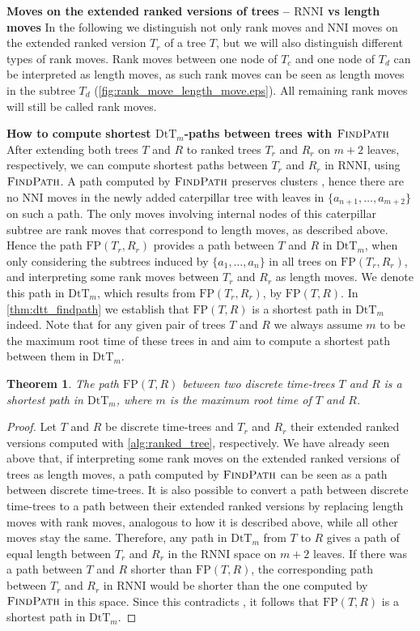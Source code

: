 \documentclass[11pt]{amsart}
\newtheorem{theorem}{Theorem}
\newcommand{\rnni}{\mathrm{RNNI}}
\newcommand{\findpath}{\textsc{FindPath}}
\newcommand{\nni}{\mathrm{NNI}}
\newcommand{\fp}{\mathrm{FP}}
\newcommand{\dtt}{\mathrm{DtT}}
\newcommand{\summary}[1]{\textbf{#1}} %
\begin{document}
\summary{Moves on the extended ranked versions of trees -- $\rnni$ vs length moves}
In the following we distinguish not only rank moves and $\nni$ moves on the extended ranked version $T_r$ of a tree $T$, but we will also distinguish different types of rank moves.
Rank moves between one node of $T_c$ and one node of $T_d$ can be interpreted as length moves, as such rank moves can be seen as length moves in the subtree $T_d$ (\autoref{fig:rank_move_length_move.eps}).
All remaining rank moves will still be called rank moves.

\summary{How to compute shortest $\dtt_m$-paths between trees with $\findpath$}
After extending both trees $T$ and $R$ to ranked trees $T_r$ and $R_r$ on $m+2$ leaves, respectively, we can compute shortest paths between $T_r$ and $R_r$ in $\rnni$, using $\findpath$.
A path computed by $\findpath$ preserves clusters \autocite{Collienne2020-iu}, hence there are no $\nni$ moves in the newly added caterpillar tree with leaves in $\{a_{n+1}, \ldots, a_{m+2}\}$ on such a path.
The only moves involving internal nodes of this caterpillar subtree are rank moves that correspond to length moves, as described above.
Hence the path $\fp(T_r,R_r)$ provides a path between $T$ and $R$ in $\dtt_m$, when only considering the subtrees induced by $\{a_1, \ldots, a_n\}$ in all trees on $\fp(T_r, R_r)$, and interpreting some rank moves between $T_r$ and $R_r$ as length moves.
We denote this path in $\dtt_m$, which results from $\fp(T_r, R_r)$, by $\fp(T,R)$.
In \autoref{thm:dtt_findpath} we establish that $\fp(T,R)$ is a shortest path in $\dtt_m$ indeed.
Note that for any given pair of trees $T$ and $R$ we always assume $m$ to be the maximum root time of these trees in and aim to compute a shortest path between them in $\dtt_m$. 

\begin{theorem}
	The path $\fp(T,R)$ between two discrete time-trees $T$ and $R$ is a shortest path in $\dtt_m$, where $m$ is the maximum root time of $T$ and $R$.
	\label{thm:dtt_findpath}
\end{theorem}

\begin{proof}
	Let $T$ and $R$ be discrete time-trees and $T_r$ and $R_r$ their extended ranked versions computed with \autoref{alg:ranked_tree}, respectively.
	We have already seen above that, if interpreting some rank moves on the extended ranked versions of trees as length moves, a path computed by $\findpath$ can be seen as a path between discrete time-trees.
	It is also possible to convert a path between discrete time-trees to a path between their extended ranked versions by replacing length moves with rank moves, analogous to how it is described above, while all other moves stay the same.
	Therefore, any path in $\dtt_m$ from $T$ to $R$ gives a path of equal length between $T_r$ and $R_r$ in the $\rnni$ space on $m+2$ leaves.
	If there was a path between $T$ and $R$ shorter than $\fp(T,R)$, the corresponding path between $T_r$ and $R_r$ in $\rnni$ would be shorter than the one computed by $\findpath$ in this space.
	Since this contradicts \autocite[Theorem 1]{Collienne2020-iu}, it follows that $\fp(T,R)$ is a shortest path in $\dtt_m$.
\end{proof}
\end{document}
